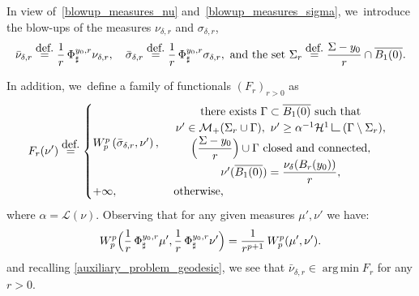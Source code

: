 \documentclass[11pt]{article}
\numberwithin{equation}{section}
\theoremstyle{definition}
\newcommand{\eqdef}{\ensuremath{\stackrel{\mbox{\upshape\tiny def.}}{=}}}
\newcommand\LM[1]{\hbox{\vrule width.5pt \vbox to#1pt{\vfill \hrule width#1pt height.5pt}}}
\newcommand\LL{{\mathchoice {\>\LM7\>}{\>\LM7\>}{\,\LM5\,}{\,\LM{3.35}\,}}}
\newcommand{\mres}{\LL}
\newcommand\cH{\mathcal{H}}
\DeclareMathOperator*{\argmin}{arg\,min}
\begin{document}
In view of~\eqref{blowup_measures_nu} and~\eqref{blowup_measures_sigma}, we~introduce the blow-ups of the measures $\nu_{\delta ,r}$ and $\sigma_{\delta , r}$,
\begin{equation}\label{blowup_measures_renormalized}
\bar\nu_{\delta ,r}
\eqdef
\frac{1}{r}\,
\Phi^{y_0,r}_{\sharp}
\nu_{\delta ,r},
\quad
\bar\sigma_{\delta ,r}
\eqdef
\frac{1}{r}\,\Phi^{y_0,r}_{\sharp}
\sigma_{\delta , r},
\text{ and the set }
\Sigma_r \eqdef
\frac{\Sigma - y_0}{r}\cap \overline{B_1(0)}.
\end{equation}

In addition, we~define a family of functionals ${\left(F_r\right)}_{r > 0}$ as
\begin{equation}\label{family_Fr}
F_r(\nu') \eqdef
\begin{cases}
W_p^p\left(
\bar \sigma_{\delta ,r},
\nu'
\right),&
\begin{array}{c}
\text{there exists $\Gamma \subset \overline{B_1(0)}$ such that}\\
\nu' \in \mathcal{M}_+(\Sigma_r \cup \Gamma), \
\nu' \ge \alpha^{-1}\cH^1\mres(\Gamma\setminus \Sigma_r),\\
\Bigl(\dfrac{\Sigma-y_0}{r}\Bigr) \cup \Gamma \text{ closed and connected}, \\
\nu'(\overline{B_1(0)}) = \dfrac{\nu_\delta(B_r(y_0))}{r},
\end{array} \\
+\infty,& \text{ otherwise,}
\end{cases}
\end{equation}
where $\alpha = \mathcal{L}(\nu)$.
Observing that for any given measures $\mu', \nu'$ we have:
\begin{equation}\label{blowup_Wasserstein_identity}
W_p^p
\Bigl(
\frac{1}{r}\,\Phi^{y_0, r}_\sharp \mu',
\frac{1}{r}\,\Phi^{y_0, r}_\sharp \nu'
\Bigr)
=
\frac{1}{r^{p+1}}\,
W_p^p( \mu', \nu').
\end{equation}
and recalling
\eqref{auxiliary_problem_geodesic},
we see that $\bar \nu_{\delta ,r} \in \argmin F_r$ for any $r>0$.
\end{document}
